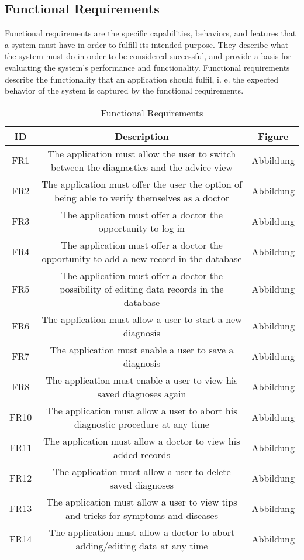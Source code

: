 \subsection{Functional Requirements}
Functional requirements are the specific capabilities, behaviors, and features that a system must have in order to fulfill its intended purpose. They describe what the system must do in order to be considered successful, and provide a basis for evaluating the system's performance and functionality. Functional requirements describe the functionality that an application should fulfil, i. e. the expected behavior of the system is captured by the functional requirements. 
\begin{table}[H]
	\begin{center}
		\scriptsize
		\def\arraystretch{2}%
		\begin{tabularx}{\textwidth}{ c|c|c}
			\hline
			ID & Description & Figure \\
			\hline
			FR1 & The application must allow the user to switch between the diagnostics and the advice view & Abbildung \\
			\hline
			FR2 & The application must offer the user the option of being able to verify themselves as a doctor & Abbildung \\
			\hline
			FR3 & The application must offer a doctor the opportunity to log in & Abbildung \\
			\hline
			FR4 & The application must offer a doctor the opportunity to add a new record in the database & Abbildung \\
			\hline
			FR5 & The application must offer a doctor the possibility of editing data records in the database & Abbildung \\
			\hline
			FR6 & The application must allow a user to start a new diagnosis & Abbildung \\
			\hline
			FR7 & The application must enable a user to save a diagnosis & Abbildung \\
			\hline	
			FR8 & The application must enable a user to view his saved diagnoses again & Abbildung \\
			\hline
			FR10 & The application must allow a user to abort his diagnostic procedure at any time & Abbildung \\
			\hline
			FR11 & The application must allow a doctor to view his added records & Abbildung \\
			\hline
			FR12 & The application must allow a user to delete saved diagnoses & Abbildung \\
			\hline
			FR13 & The application must allow a user to view tips and tricks for symptoms and diseases & Abbildung \\
			\hline
			FR14 & The application must allow a doctor to abort adding/editing data at any time& Abbildung\\
			\hline
		\end{tabularx}
		\normalsize
	\end{center}
	\caption{Functional Requirements}
\end{table}

